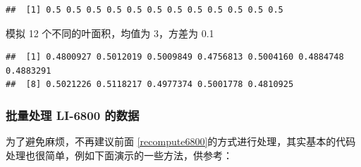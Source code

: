 \documentclass[
]{krantz}
\makeatletter
\newenvironment{Shaded}{\begin{snugshade}}{\end{snugshade}}
\newcommand{\AttributeTok}[1]{\textcolor[rgb]{0.77,0.63,0.00}{#1}}
\newcommand{\DecValTok}[1]{\textcolor[rgb]{0.00,0.00,0.81}{#1}}
\newcommand{\FloatTok}[1]{\textcolor[rgb]{0.00,0.00,0.81}{#1}}
\newcommand{\FunctionTok}[1]{\textcolor[rgb]{0.00,0.00,0.00}{#1}}
\newcommand{\NormalTok}[1]{#1}
\newcommand{\OtherTok}[1]{\textcolor[rgb]{0.56,0.35,0.01}{#1}}
\newcommand{\SpecialCharTok}[1]{\textcolor[rgb]{0.00,0.00,0.00}{#1}}
\newcommand{\StringTok}[1]{\textcolor[rgb]{0.31,0.60,0.02}{#1}}
\newenvironment{kframe}{%
\medskip{}
\setlength{\fboxsep}{.8em}
 \def\at@end@of@kframe{}%
 \ifinner\ifhmode%
  \def\at@end@of@kframe{\end{minipage}}%
  \begin{minipage}{\columnwidth}%
 \fi\fi%
 \def\FrameCommand##1{\hskip\@totalleftmargin \hskip-\fboxsep
 \colorbox{shadecolor}{##1}\hskip-\fboxsep
     \hskip-\linewidth \hskip-\@totalleftmargin \hskip\columnwidth}%
 \MakeFramed {\advance\hsize-\width
   \@totalleftmargin\z@ \linewidth\hsize
   \@setminipage}}%
 {\par\unskip\endMakeFramed%
 \at@end@of@kframe}
\renewenvironment{Shaded}{\begin{kframe}}{\end{kframe}}
\makeatother
\begin{document}
\begin{verbatim}
##  [1] 0.5 0.5 0.5 0.5 0.5 0.5 0.5 0.5 0.5 0.5 0.5 0.5
\end{verbatim}

模拟 12 个不同的叶面积，均值为 3，方差为 0.1

\begin{Shaded}
\end{Shaded}

\begin{verbatim}
##  [1] 0.4800927 0.5012019 0.5009849 0.4756813 0.5004160 0.4884748 0.4883291
##  [8] 0.5021226 0.5118217 0.4977374 0.5001778 0.4810925
\end{verbatim}

\hypertarget{batch-6800-xlsx}{%
\subsubsection{批量处理 LI-6800 的数据}\label{batch-6800-xlsx}}

为了避免麻烦，不再建议前面 \ref{recompute6800}的方式进行处理，其实基本的代码处理也很简单，例如下面演示的一些方法，供参考：
\end{document}
